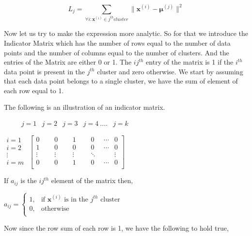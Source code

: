 \documentclass[english]{article}
\theoremstyle{plain}
\begin{document}
\begin{equation}
L_{j} = \sum_{\forall i: \boldsymbol{x}^{(i)} \in j^{th} cluster} \| \boldsymbol{x}^{(i)} - \boldsymbol{\mu}^{(j)} \|^{2}
\end{equation}

Now let us try to make the expression more analytic. So for that we introduce the Indicator Matrix which has the number of rows equal to the number of data points and the number of columns equal to the number of clusters. And the entries of the Matrix are either 0 or 1. The $ij^{th}$ entry of the matrix is 1 if the $i^{th}$ data point is present in the $j^{th}$ cluster and zero otherwise. We start by assuming that each data point belongs to a single cluster, we have the sum of element of each row equal to 1.

The following is an illustration of 
an indicator matrix.

\bigskip

$
\begin{matrix}
\:\;\;\;\;\;\;\; j=1 & j=2 & j=3 & j=4\:....&j=k
\end{matrix}
$

$
\begin{matrix}
i = 1 \\
i = 2 \\
\vdots \\
i=m \\
\end{matrix}
$
$
\begin{bmatrix}
0 \;\;\;\;\; & 0 \;\;\;\;\; & 1 \;\;\;\;\; & 0 \;\;\;\;\; \cdots & 0 \\
1 \;\;\;\;\; & 0 \;\;\;\;\; & 0 \;\;\;\;\; & 0 \;\;\;\;\; \cdots & 0 \\
\vdots & \vdots & \vdots & \ddots & \vdots \\
0 \;\;\;\;\; & 0 \;\;\;\;\; & 1 \;\;\;\;\; & 0 \;\;\;\;\; \cdots & 0 \\
\end{bmatrix}
$

If $a_{ij}$ is the ${ij}^{th}$ element of the matrix then,

$
a_{ij} =
\begin{cases}
1, & \text{if $\boldsymbol{x}^{(i)}$ is in the $j^{th}$ cluster} \\
0, & \text{otherwise} \\
\end{cases}
$

Now since the row sum of each row is 1, we have the following to hold true,
\end{document}
